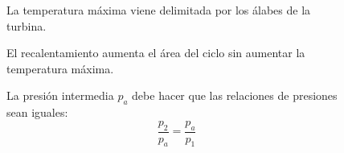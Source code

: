 \begin{figure}[H]
\begin{minipage}{0.6\textwidth}
\begin{figure}[H]
						\label{fig:my_label}
					\end{figure}
				\end{minipage}
				\begin{minipage}{0.4\textwidth}
					La temperatura máxima viene delimitada por los álabes de la turbina.
					
					\vspace{0.25cm}
					El recalentamiento aumenta el área del ciclo sin aumentar la temperatura máxima.
					
					\vspace{0.25cm}
					La presión intermedia $p_a$ debe hacer que las relaciones de presiones sean iguales:
					\[\dfrac{p_2}{p_a} = \dfrac{p_a}{p_1}\]
				\end{minipage}
			\end{figure}
			
